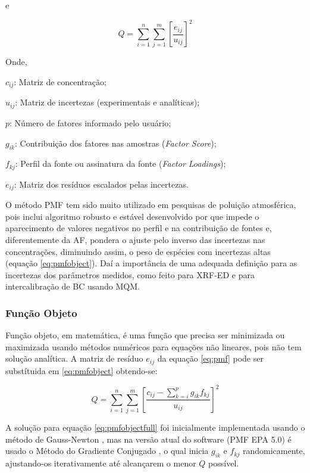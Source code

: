 e

\begin{equation}
  Q = \sum_{i=1}^n \sum_{j=1}^m  \left[ \frac{e_{ij}} {u_{ij}} \right] ^2
  \label{eq:pmfobject}
\end{equation}

Onde,
\begin{itemize}
  \begin{spacing}{1.0}
	\item $c_{ij}$: Matriz de concentração;
	\item $u_{ij}$: Matriz de incertezas (experimentais e analíticas);
	\item $p$: Número de fatores informado pelo usuário;
	\item $g_{ik}$: Contribuição dos fatores nas amostras (\textit{Factor Score});
	\item $f_{kj}$: Perfil da fonte ou assinatura da fonte (\textit{Factor Loadings});
	\item $e_{ij}$: Matriz dos resíduos escalados pelas incertezas.
  \end{spacing}
\end{itemize}

O método PMF tem sido muito utilizado em pesquisas de poluição 
atmosférica, pois inclui algoritmo robusto e estável desenvolvido por 
\citet{paatero1994} que impede o aparecimento de valores negativos no 
perfil e na contribuição de fontes e, diferentemente da AF, pondera o ajuste 
pelo inverso das incertezas nas concentrações, diminuindo assim, o peso de 
espécies com incertezas altas (equação \ref{eq:pmfobject}).
Daí a importância de uma adequada definição para as incertezas dos parâmetros 
medidos, como feito para XRF-ED e para intercalibração de BC usando MQM.

\subsubsection{Função Objeto}

Função objeto, em matemática, é uma função que precisa ser minimizada 
ou maximizada usando métodos numéricos para equações não lineares, pois não 
tem solução analítica. A matriz de resíduo ${e_{ij}}$ da equação \ref{eq:pmf}
pode ser substítuida em \ref{eq:pmfobject} obtendo-se:

\begin{equation}
  Q = \sum_{i=1}^n \sum_{j=1}^m  \left[ \frac{c_{ij} - \sum_{k=i}^p g_{ik}f_{kj}} {u_{ij}} \right] ^2
  \label{eq:pmfobjectfull}
\end{equation}

A solução para equação \ref{eq:pmfobjectfull} foi inicialmente implementada usando 
o método de Gauss-Newton \citep{paatero1994}, mas na versão atual do software 
(PMF EPA 5.0) é usado o Método do Gradiente Conjugado \citep{norris2014}, 
o qual inicia $g_{ik}$ e $f_{kj}$ randomicamente, ajustando-os iterativamente até alcançarem o menor $Q$ possível.


